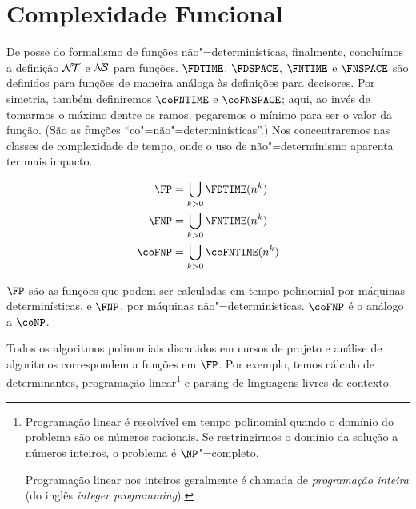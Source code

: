 \section{Complexidade Funcional}
\label{sec:functional_complexity}

De posse do formalismo de funções não"=determinísticas,
finalmente,
concluímos a definição ${\mathcal{N\!T}}$ e ${\mathcal{N\!\!S}}$ para funções.
$\FDTIME$, $\FDSPACE$, $\FNTIME$ e $\FNSPACE$
são definidos para funções de maneira análoga às definições para decisores.
Por simetria, também definiremos $\coFNTIME$ e $\coFNSPACE$;
aqui, ao invés de tomarmos o máximo dentre os ramos,
pegaremos o mínimo para ser o valor da função.
(São as funções ``co"=não"=determinísticas''.)
Nos concentraremos nas classes de complexidade de tempo,
onde o uso de não"=determinismo aparenta ter mais impacto.

\begin{definition}
    \begin{align*}
        \FP &= \bigcup_{k > 0} \FDTIME(n^k) \\
        \FNP &= \bigcup_{k > 0} \FNTIME(n^k) \\
        \coFNP &= \bigcup_{k > 0} \coFNTIME(n^k)
    \end{align*}
\end{definition}

$\FP$ são as funções que podem ser calculadas
em tempo polinomial por máquinas determinísticas,
e $\FNP$, por máquinas não"=determinísticas.\footnotemark
$\coFNP$ é o análogo a $\coNP$.

\begin{example}
    Todos os algoritmos polinomiais
    discutidos em cursos de projeto e análise de algoritmos
    correspondem a funções em $\FP$.
    Por exemplo,
    temos cálculo de determinantes,
    programação linear\footnote{
        Programação linear é resolvível em tempo polinomial
        quando o domínio do problema são os números racionais.
        Se restringirmos o domínio da solução a números inteiros,
        o problema é $\NP$"=completo.

        Programação linear nos inteiros geralmente é chamada de
        \emph{programação inteira}
        (do inglês \emph{integer programming}).
    }
    e parsing de linguagens livres de contexto.
\end{example}

